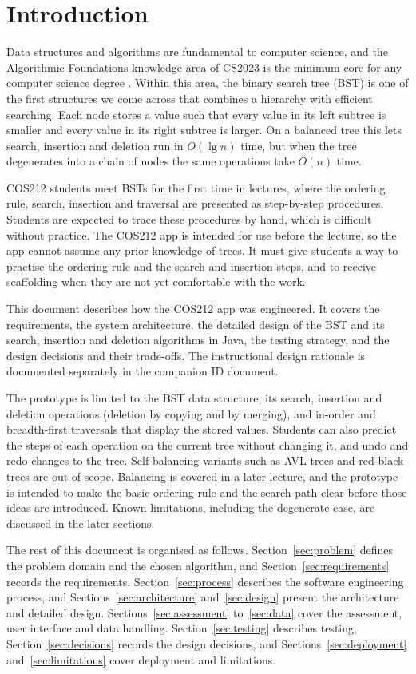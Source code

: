 \section{Introduction}


Data structures and algorithms are fundamental to computer science, and the Algorithmic Foundations knowledge area of CS2023 is the minimum core for any computer science degree \cite{Kumar2024}. Within this area, the binary search tree (BST) is one of the first structures we come across that combines a hierarchy with efficient searching. Each node stores a value such that every value in its left subtree is smaller and every value in its right subtree is larger. On a balanced tree this lets search, insertion and deletion run in $O(\lg n)$ time, but when the tree degenerates into a chain of nodes the same operations take $O(n)$ time.

COS212 students meet BSTs for the first time in lectures, where the ordering rule, search, insertion and traversal are presented as step-by-step procedures. Students are expected to trace these procedures by hand, which is difficult without practice. The COS212 app is intended for use before the lecture, so the app cannot assume any prior knowledge of trees. It must give students a way to practise the ordering rule and the search and insertion steps, and to receive scaffolding when they are not yet comfortable with the work.

This document describes how the COS212 app was engineered. It covers the requirements, the system architecture, the detailed design of the BST and its search, insertion and deletion algorithms in Java, the testing strategy, and the design decisions and their trade-offs. The instructional design rationale is documented separately in the companion ID document.

The prototype is limited to the BST data structure, its search, insertion and deletion operations (deletion by copying and by merging), and in-order and breadth-first traversals that display the stored values. Students can also predict the steps of each operation on the current tree without changing it, and undo and redo changes to the tree. Self-balancing variants such as AVL trees and red-black trees are out of scope. Balancing is covered in a later lecture, and the prototype is intended to make the basic ordering rule and the search path clear before those ideas are introduced. Known limitations, including the degenerate case, are discussed in the later sections.

The rest of this document is organised as follows. Section~\ref{sec:problem} defines the problem domain and the chosen algorithm, and Section~\ref{sec:requirements} records the requirements. Section~\ref{sec:process} describes the software engineering process, and Sections~\ref{sec:architecture} and~\ref{sec:design} present the architecture and detailed design. Sections~\ref{sec:assessment} to~\ref{sec:data} cover the assessment, user interface and data handling. Section~\ref{sec:testing} describes testing, Section~\ref{sec:decisions} records the design decisions, and Sections~\ref{sec:deployment} and~\ref{sec:limitations} cover deployment and limitations.